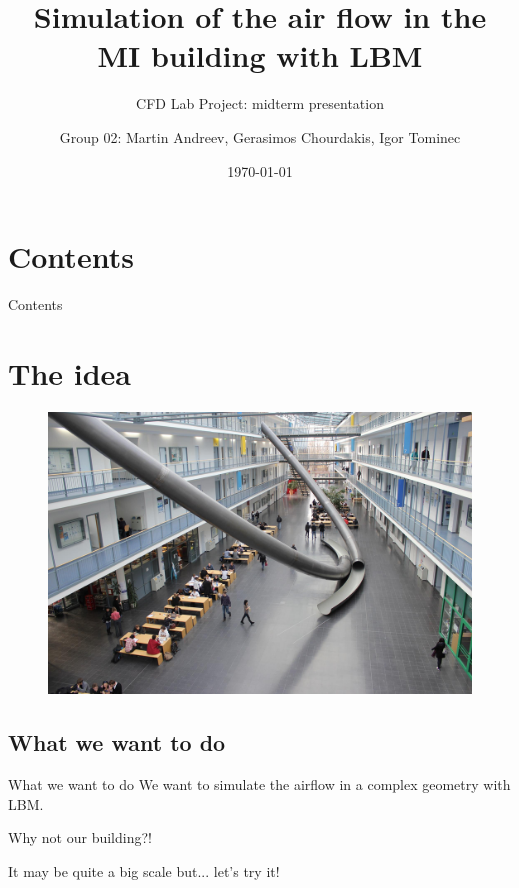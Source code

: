 \documentclass[9pt,pdftex]{beamer}
\title{Simulation of the air flow in the MI building with LBM}
\subtitle{CFD Lab Project: midterm presentation}
\author[Group 02]{Group 02: Martin Andreev, Gerasimos Chourdakis, Igor Tominec} %
\date{\today}
\institute{Technische Universität München}
\begin{document}
	\frame{\titlepage}

\section*{Contents}
\begin{frame}{Contents}
\tableofcontents
\end{frame}
	

\section{The idea}

\begin{frame}{}
\begin{figure}
 \includegraphics[scale=0.13]{MI_slides}
\end{figure}
\end{frame}

\subsection{What we want to do}
\begin{frame}{What we want to do}
 We want to simulate the airflow in a complex geometry with LBM. 
 
 Why not our building?!
 
 It may be quite a big scale but... let's try it!

\end{frame}
\end{document}
